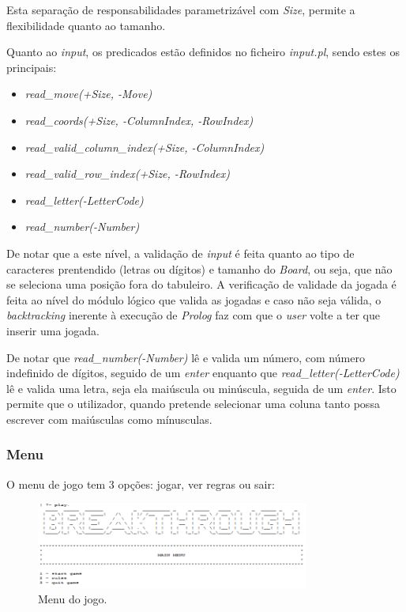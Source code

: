 \documentclass[a4paper,11pt,portuguese]{article}
\begin{document}
    \noindent Esta separação de responsabilidades parametrizável com \textit{Size}, permite
    a flexibilidade quanto ao tamanho.

    \noindent Quanto ao \textit{input}, os predicados estão definidos no ficheiro \textit{input.pl},
    sendo estes os principais:

    \begin{itemize}[topsep=4pt,itemsep=2pt]
        \item \textit{read\_move(+Size, -Move) }
        \item \textit{read\_coords(+Size, -ColumnIndex, -RowIndex) }
        \item \textit{read\_valid\_column\_index(+Size, -ColumnIndex) }
        \item \textit{read\_valid\_row\_index(+Size, -RowIndex) }
        \item \textit{read\_letter(-LetterCode) }
        \item \textit{read\_number(-Number) }
    \end{itemize}
    
    \noindent De notar que a este nível, a validação de \textit{input} é feita quanto
    ao tipo de caracteres prentendido (letras ou dígitos) e tamanho do \textit{Board},
    ou seja, que não se seleciona uma posição fora do tabuleiro. A verificação de
    validade da jogada é feita ao nível do módulo lógico que valida as jogadas e caso
    não seja válida, o \textit{backtracking} inerente à execução de \textit{Prolog}
    faz com que o \textit{user} volte a ter que inserir uma jogada.

    De notar que \textit{read\_number(-Number)} lê e valida um número, com número
    indefinido de dígitos, seguido de um \textit{enter} enquanto que
    \textit{read\_letter(-LetterCode)} lê e valida uma letra, seja ela maiúscula
    ou minúscula, seguida de um \textit{enter}. Isto permite que o utilizador,
    quando pretende selecionar uma coluna tanto possa escrever com maiúsculas
    como mínusculas.


    \subsubsection{Menu}
    O menu de jogo tem 3 opções: jogar, ver regras ou sair:

    \begin{figure}[H]
        \centering
        \includegraphics[width=0.8\textwidth]{imgs/main_menu.png}
        \caption{Menu do jogo.}
        \label{fig:main_menu}
    \end{figure}
\end{document}
